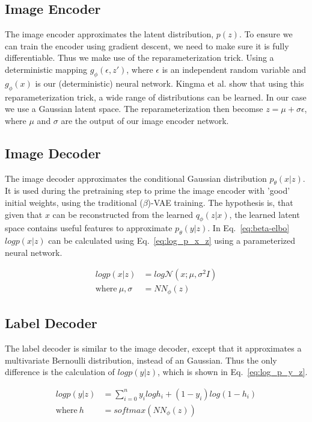 \subsection{Image Encoder}
The image encoder approximates the latent distribution, $p(z)$. To ensure we can train the encoder using gradient descent, we need to make sure it is fully differentiable. Thus we make use of the reparameterization trick. Using a deterministic mapping $g_\phi(\epsilon, z')$, where $\epsilon$ is an independent random variable and $g_\phi(x)$ is our (deterministic) neural network. Kingma et al. show that using this reparameterization trick, a wide range of distributions can be learned. In our case we use a Gaussian latent space. The reparameterization then becomse $z = \mu + \sigma \epsilon$, where $\mu$ and $\sigma$ are the output of our image encoder network.

\subsection{Image Decoder}
The image decoder approximates the conditional Gaussian distribution $p_\theta(x|z)$. It is used during the pretraining step to prime the image encoder with 'good' initial weights, using the traditional ($\beta$)-VAE training. The hypothesis is, that given that $x$ can be reconstructed from the learned $q_\phi(z|x)$, the learned latent space contains useful features to approximate $p_\theta(y|z)$. In Eq.~\ref{eq:beta-elbo} $log p(x|z)$ can be calculated using Eq.~\ref{eq:log_p_x_z} using a parameterized neural network.

\begin{equation}
    \begin{split}
        log p(x|z)              & = log \mathcal{N}(x; \mu, \sigma^2I) \label{eq:log_p_x_z} \\
        \text{where}~\mu,\sigma & =NN_\phi(z)
    \end{split}
\end{equation}

\subsection{Label Decoder}
The label decoder is similar to the image decoder, except that it approximates a multivariate Bernoulli distribution, instead of an Gaussian. Thus the only difference is the calculation of $log p(y|z)$, which is shown in Eq.~\ref{eq:log_p_y_z}.

\begin{subequations}
    \begin{align}
        log p(y|z)     & = \sum_{i=0}^n y_i log h_i + (1 - y_i)log(1-h_i) \label{eq:log_p_y_z} \\
        \text{where}~h & = softmax(NN_\phi(z))
    \end{align}
\end{subequations}

